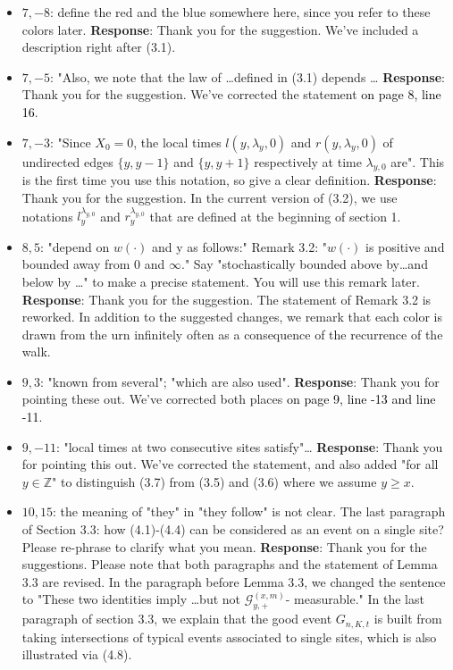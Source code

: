 \documentclass[11pt,a4paper]{article}
\numberwithin{equation}{section}
\newcommand{\PL}[2]{\textcolor{black}{on page {#1}, line {#2}}}
\begin{document}
\begin{itemize}
		\item 
		$7,-8$: define the red and the blue somewhere here, since you refer to these colors later.
		\subitem \textbf{Response}: Thank you for the suggestion. We've included a description right after (3.1).
		
		\item 
		$7,-5$: "Also, we note that the law of \dots defined in (3.1) depends \dots
		\subitem \textbf{Response}: Thank you for the suggestion. We've corrected the statement \PL{8}{16}.
		
		\item 
		$7,-3$: "Since $X_0 = 0$, the local times $l(y, \lambda_y,0)$ and $r(y, \lambda_y,0)$ of undirected edges $\{y, y-1\}$ and $\{y, y+1 \}$ respectively at time $\lambda_{y,0}$ are". This is the first time you use this notation, so give a clear
		definition.
		\subitem \textbf{Response}: Thank you for the suggestion. In the current version of (3.2), we use notations $l_{y}^{\lambda_{y,0}}$ and $r_{y}^{\lambda_{y,0}}$ that are defined at the beginning of section 1. 
		
		
		\item 
		$8,5$: "depend on $w(\cdot)$ and y as follows:"
		Remark 3.2: "$w(\cdot)$ is positive and bounded away from $0$ and $\infty$." Say "stochastically bounded above by\dots and below by \dots " to make a precise statement. You will use this remark later.
		\subitem \textbf{Response}: Thank you for the suggestion. The statement of Remark 3.2 is reworked. In addition to the suggested changes, we remark that each color is drawn from the urn infinitely often as a consequence of the recurrence of the walk.
		
		
		\item 
		$9,3$: "known from several"; "which are also used".
		\subitem \textbf{Response}:  Thank you for pointing these out. We've corrected both places \PL{9}{-13 and line -11}. 
		
		\item 
		$9,-11$: "local times at two consecutive sites satisfy"\dots
		\subitem \textbf{Response}: Thank you for pointing this out. We've corrected the statement, and also added "for all $y\in \mathbb{Z}$" to distinguish (3.7) from (3.5) and (3.6) where we assume $y\geq x$.
		
		\item 
		$10,15$: the meaning of "they" in "they follow" is not clear.
		The last paragraph of Section 3.3: how (4.1)-(4.4) can be considered as an event on a single site?
		Please re-phrase to clarify what you mean.
		\subitem \textbf{Response}: Thank you for the suggestions. Please note that both paragraphs and the statement of Lemma 3.3 are revised. In the paragraph before Lemma 3.3, we changed the sentence to "These two identities imply \dots but not $\mathcal{G}_{y,+}^{(x,m)}$- measurable." In the last paragraph of section 3.3, we explain that the good event $G_{n,K,t}$ is built from taking intersections of typical events associated to single sites, which is also illustrated via (4.8). 
		

\end{itemize}
\end{document}
